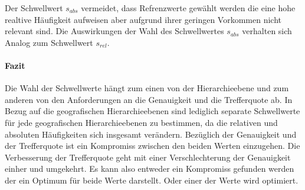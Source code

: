 				Der Schwellwert $s_{abs}$ vermeidet, dass Refrenzwerte gewählt werden die eine hohe realtive Häufigkeit aufweisen aber aufgrund ihrer geringen Vorkommen nicht relevant sind.
				Die Auswirkungen der Wahl des Schwellwertes $s_{abs}$ verhalten sich Analog zum Schwellwert $s_{rel}$.

			\paragraph{Fazit}

				Die Wahl der Schwellwerte hängt zum einen von der Hierarchieebene und zum anderen von den Anforderungen an die Genauigkeit und die Trefferquote ab.
				In Bezug auf die geografischen Hierarchieebenen sind lediglich separate Schwellwerte für jede geografischen Hierarchieebenen zu bestimmen, da die relativen und absoluten Häufigkeiten sich insgesamt verändern.
				Bezüglich der Genauigkeit und der Trefferquote ist ein Kompromiss zwischen den beiden Werten einzugehen. 
				Die Verbesserung der Trefferquote geht mit einer Verschlechterung der Genauigkeit einher und umgekehrt.
				Es kann also entweder ein Kompromiss gefunden werden der ein Optimum für beide Werte darstellt. 
				Oder einer der Werte wird optimiert.  





	



	
	\newpage
	
	
			
		



	